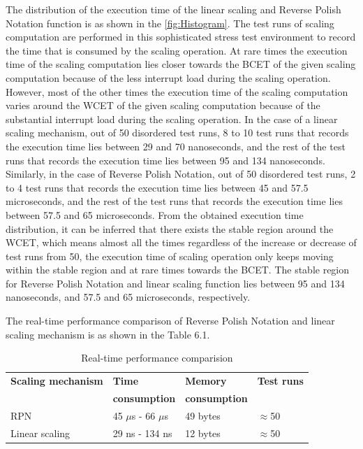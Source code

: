 The distribution of the execution time of the linear scaling and Reverse Polish Notation function is as shown in the \cref{fig:Histogram}. The test runs of scaling computation are performed in this sophisticated stress test environment to record the time that is consumed by the scaling operation. At rare times the execution time of the scaling computation lies closer towards the \gls{BCET} of the given scaling computation because of the less interrupt load during the scaling operation. However, most of the other times the execution time of the scaling computation varies around the \gls{WCET} of the given scaling computation because of the substantial interrupt load during the scaling operation. In the case of a linear scaling mechanism, out of 50 disordered test runs, 8 to 10 test runs that records the execution time lies between 29 and 70 nanoseconds, and the rest of the test runs that records the execution time lies between 95 and 134 nanoseconds. Similarly, in the case of Reverse Polish Notation, out of 50 disordered test runs, 2 to 4 test runs that records the execution time lies between 45 and 57.5 microseconds, and the rest of the test runs that records the execution time lies between 57.5 and 65 microseconds. From the obtained execution time distribution, it can be inferred that there exists the stable region around the \acrshort{WCET}, which means almost all the times regardless of the increase or decrease of test runs from 50, the execution time of scaling operation only keeps moving within the stable region and at rare times towards the \acrshort{BCET}. 
The stable region for Reverse Polish Notation and linear scaling function lies between 95 and 134 nanoseconds, and 57.5 and 65 microseconds, respectively.            

The real-time performance comparison of Reverse Polish Notation and linear scaling mechanism is as shown in the Table 6.1.

\begin{table}[hpt]
	\centering
	\label{Table:scaling}
	\caption{Real-time performance comparision}
	\begin{tabular}{|p{4cm}||p{2.5cm}|p{2.7cm}||p{2.7cm}| } 
 	\hline
 	\textbf{Scaling mechanism}   &\textbf{Time}    &\textbf{Memory}    &\textbf{Test runs}\\
 							&\textbf{consumption}    &\textbf{consumption}  &\textbf{}\\
 	\hline
	RPN   &{45 $\mu$s - 66 $\mu$s}   &49 bytes &{$\approx$50}\\
 	\hline
	Linear scaling   &{29 ns - 134 ns}   &12 bytes &{$\approx$50}\\
 	\hline
	\end{tabular}
\end{table}

